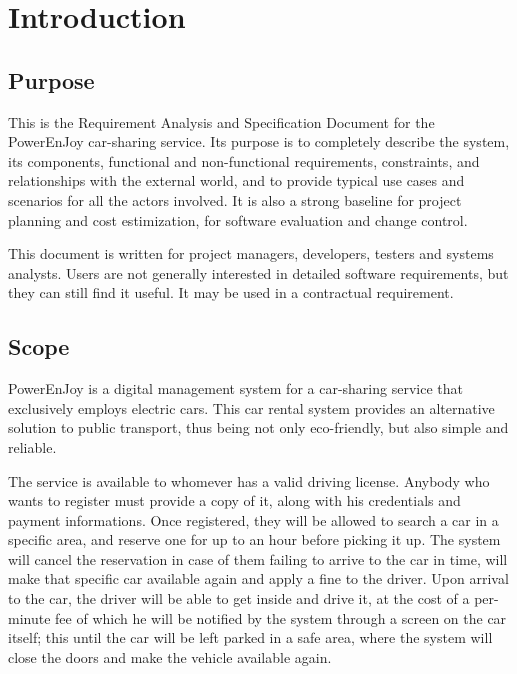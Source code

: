 \section{Introduction}\label{sec introduction}

\subsection{Purpose}

This is the  Requirement Analysis and Specification Document for the PowerEnJoy car-sharing service.
Its purpose is to completely describe the system, its components, functional and non-functional requirements, constraints, and relationships with the external world, and to provide typical use cases and scenarios for all the actors involved. It is also a strong baseline for project planning and cost estimization, for software evaluation and change control.


This document is written for project managers, developers, testers and systems analysts. Users are not generally interested in detailed software requirements, but they can still find it useful. It may be used in a contractual requirement.

\subsection{Scope}

PowerEnJoy is a digital management system for a car-sharing service that exclusively employs electric cars. This car rental system provides an alternative solution to public transport, thus being not only eco-friendly, but also simple and reliable.

The service is available to whomever has a valid driving license. Anybody who wants to register must provide a copy of it, along with his credentials and payment informations.
Once registered, they will be allowed to search a car in a specific area, and reserve one for up to an hour before picking it up. The system will cancel the reservation in case of them failing to arrive to the car in time, will make that specific car available again and apply a fine to the driver.
Upon arrival to the car, the driver will be able to get inside and drive it, at the cost of a per-minute fee of which he will be notified by the system through a screen on the car itself; this until the car will be left parked in a safe area, where the system will close the doors and make the vehicle available again.

